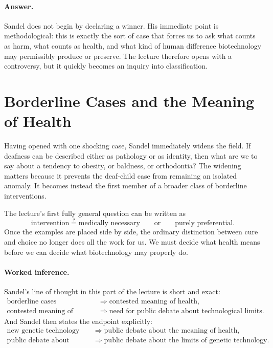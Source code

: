 \paragraph{Answer.} Sandel does not begin by declaring a winner. His immediate point is methodological: this is exactly the sort of case that forces us to ask what counts as harm, what counts as health, and what kind of human difference biotechnology may permissibly produce or preserve. The lecture therefore opens with a controversy, but it quickly becomes an inquiry into classification.

\section{Borderline Cases and the Meaning of Health}

Having opened with one shocking case, Sandel immediately widens the field. If deafness can be described either as pathology or as identity, then what are we to say about a tendency to obesity, or baldness, or orthodontia? The widening matters because it prevents the deaf-child case from remaining an isolated anomaly. It becomes instead the first member of a broader class of borderline interventions.

The lecture's first fully general question can be written as
\begin{equation}
\text{intervention}
\stackrel{?}{=}
\text{medically necessary}
\qquad \text{or} \qquad
\text{purely preferential}.
\end{equation}
Once the examples are placed side by side, the ordinary distinction between cure and choice no longer does all the work for us. We must decide what health means before we can decide what biotechnology may properly do.

\paragraph{Worked inference.} Sandel's line of thought in this part of the lecture is short and exact:
\begin{align}
\text{borderline cases}
&\Longrightarrow
\text{contested meaning of health},\\
\text{contested meaning of health}
&\Longrightarrow
\text{need for public debate about technological limits}.
\end{align}
And Sandel then states the endpoint explicitly:
\begin{align}
\text{new genetic technology}
&\Longrightarrow
\text{public debate about the meaning of health},\\
\text{public debate about health}
&\Longrightarrow
\text{public debate about the limits of genetic technology}.
\end{align}

